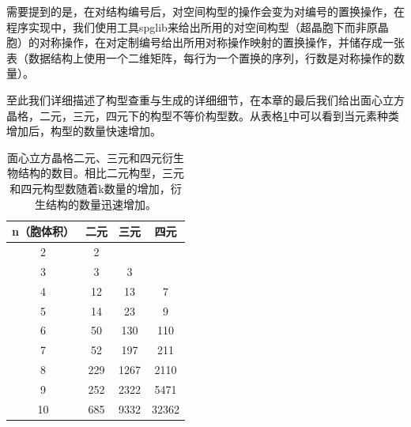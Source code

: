 需要提到的是，在对结构编号后，对空间构型的操作会变为对编号的置换操作，在程序实现中，我们使用工具spglib\cite{togo2018texttt}来给出所用的对空间构型（超晶胞下而非原晶胞）的对称操作，在对定制编号给出所用对称操作映射的置换操作，并储存成一张表（数据结构上使用一个二维矩阵，每行为一个置换的序列，行数是对称操作的数量）。

至此我们详细描述了构型查重与生成的详细细节，在本章的最后我们给出面心立方晶格，二元，三元，四元下的构型不等价构型数。从表格\ref{table:derive_structures_num}中可以看到当元素种类增加后，构型的数量快速增加。

\begin{table}
  \centering
  \begin{tabular}{cccc}
    \hline\hline
    n（胞体积） & 二元 & 三元 & 四元 \\
    \hline
    2 & 2      &         &            \\
    3 & 3      &     3    &            \\
    4 & 12      &    13     &    7        \\
    5 & 14      &    23     &    9        \\
    6 & 50      &     130    &    110        \\
    7 & 52      &      197   &      211      \\
    8 & 229      &     1267    &      2110      \\
    9 & 252      &     2322    &       5471     \\
    10 & 685      &    9332     &      32362      \\
    \hline\hline
  \end{tabular}
  \caption{面心立方晶格二元、三元和四元衍生物结构的数目。相比二元构型，三元和四元构型数随着k数量的增加，衍生结构的数量迅速增加。}
  \label{table:derive_structures_num}
\end{table}
